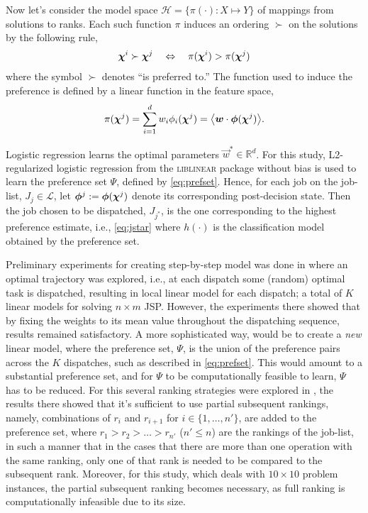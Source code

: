 \documentclass[smallextended]{svjour3}
\begin{document}
	Now let's consider the model space $\mathcal{H} = \{\pi(\cdot) : X \mapsto Y\}$ 
	of mappings from solutions to ranks. Each such 
	function $\pi$ induces an ordering $\succ$ on the solutions  by the following 
	rule,
	\begin{equation}\label{eq:linear}
	\bm \chi^i \succ \bm \chi^j \quad \Leftrightarrow \quad \pi(\bm \chi^i) > 
	\pi(\bm \chi^j)
	\end{equation}
	where the symbol $\succ$ denotes ``is preferred to.''  The function used to 
	induce the preference is defined by a linear function in the feature space,
	\begin{equation} 
	\pi(\vchi^j)=\sum_{i=1}^d w_i\phi_i(\vchi^j)=\inner{\vec{w}}{\vphi(\vchi^j)}.
	\end{equation}
	
	Logistic regression learns the optimal parameters $\vec{w}^*\in\mathbb{R}^d$. 
	For this study, L2-regularized logistic regression from the \textsc{liblinear} 
	package \cite{liblinear} without bias is used to learn the preference set 
	$\Psi$, defined by \cref{eq:prefset}.
	Hence, for each job on the job-list, $J_j\in\mathcal{L}$, let 
	$\bm{\phi}^j:=\bm{\phi}(\bm \chi^j)$ denote its corresponding  post-decision state. 
	Then the job chosen to be dispatched, $J_{j^*}$, is the one corresponding to 
	the highest preference estimate, i.e., \cref{eq:jstar} where $h(\cdot)$ is the 
	classification model obtained by the preference set.
	
	Preliminary experiments for creating step-by-step model was done in 
	\cite{InRu11a} where an optimal trajectory was explored, i.e., at each dispatch 
	some (random) optimal task is dispatched, resulting in local linear model for 
	each dispatch; a total of $K$ linear models for solving $n\times m$ JSP. 
	However, the experiments there showed that by fixing the weights to its mean 
	value throughout the dispatching sequence, results remained satisfactory.
	A more sophisticated way, would be to create a \emph{new} linear model, where 
	the preference set, $\Psi$, is the union of the preference pairs across the 
	$K$ dispatches, such as described in \cref{eq:prefset}. 
	This would amount to a substantial preference set, and for $\Psi$ to be 
	computationally feasible to learn, $\Psi$ has to be reduced. For this several 
	ranking strategies were explored in \cite{InRu15a}, the results there showed 
	that it's sufficient to use partial subsequent rankings, namely, combinations 
	of $r_i$ and $r_{i+1}$ for $i\in\{1,\ldots,n'\}$, are added to the preference 
	set, where $r_1>r_2>\ldots>r_{n'}$ ($n'\leq n$) are the rankings of the 
	job-list, in such a manner that in the cases that there are more than one 
	operation with the same ranking, only one of that rank is needed to be compared 
	to the subsequent rank. 
	Moreover, for this study, which deals with $10\times 10$ problem instances, 
	the partial subsequent ranking becomes necessary, as full ranking is 
	computationally infeasible due to its size. 
	
\end{document}

